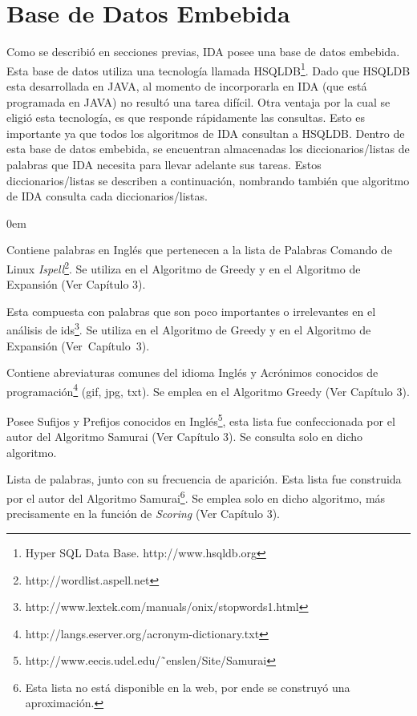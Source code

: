 \section{Base de Datos Embebida}
\label{sec:bseEmb}

Como se describió en secciones previas, IDA posee una base de datos embebida. Esta base de datos utiliza una tecnología llamada HSQLDB\footnote[1]{Hyper SQL Data Base. http://www.hsqldb.org}. Dado que HSQLDB esta desarrollada en JAVA, al momento de incorporarla en IDA (que está programada en JAVA) no resultó una tarea difícil.
Otra ventaja por la cual se eligió esta tecnología, es que responde rápidamente las consultas. Esto es importante ya que todos los algoritmos de IDA consultan a HSQLDB. Dentro de esta base de datos embebida, se encuentran almacenadas los diccionarios/listas de palabras que IDA necesita para llevar adelante sus tareas. Estos diccionarios/listas se describen a continuación, nombrando también que algoritmo de IDA consulta cada diccionarios/listas.

\begin{description}
\itemsep0em%

\item[Diccionario en Inglés (ispell):] Contiene palabras en Inglés que pertenecen a la lista de Palabras Comando de Linux \textit{Ispell}\footnote[2]{ http://wordlist.aspell.net}. Se utiliza en el Algoritmo de Greedy y en el Algoritmo de Expansión (Ver Capítulo 3).

\item[Lista de Palabras Excluyentes (stop-list):] Esta compuesta con palabras que son poco importantes o irrelevantes en el análisis de ids\footnote[3]{ http://www.lextek.com/manuals/onix/stopwords1.html}. Se utiliza en el Algoritmo de Greedy y en el Algoritmo de Expansión \mbox{(Ver Capítulo 3)}.

\item[Lista de Abreviaturas y Acrónimos Conocidas:] Contiene abreviaturas comunes del idioma Inglés y Acrónimos conocidos de programación\footnote[4]{http://langs.eserver.org/acronym-dictionary.txt} (gif, jpg, txt). Se emplea en el Algoritmo Greedy (Ver Capítulo 3).

\item[Lista de Prefijos y Sufijos Conocidos:] Posee Sufijos y Prefijos conocidos en Inglés\footnote[5]{http://www.eecis.udel.edu/˜enslen/Site/Samurai}, esta lista fue confeccionada por el autor del Algoritmo Samurai (Ver Capítulo 3). Se consulta solo en dicho algoritmo.
\pagebreak
\item[Frecuencias Globales de Palabras:] Lista de palabras, junto con su frecuencia de aparición. Esta lista fue construida por el autor del Algoritmo Samurai\footnote[1]{Esta lista no está disponible en la web, por ende se construyó una aproximación.}. Se emplea solo en dicho algoritmo, más precisamente en la función de \textit{Scoring} (Ver Capítulo 3).

\end{description}

